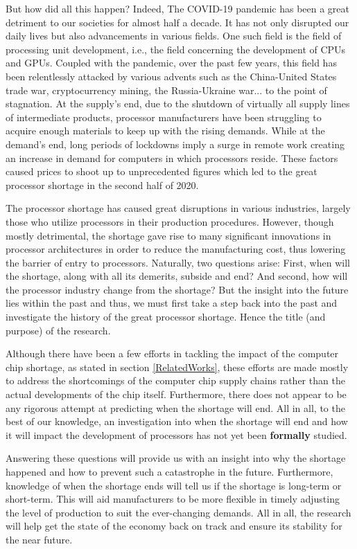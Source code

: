\documentclass[conference]{IEEEtran}
\begin{document}
But how did all this happen? Indeed, The COVID-19 pandemic has been a
great detriment to our societies for almost half a decade. It has not
only disrupted our daily lives but also advancements in various
fields. One such field is the field of processing unit development, i.e.,
the field concerning the development of CPUs and GPUs. Coupled with the
pandemic, over the past few years, this field has been relentlessly attacked
by various advents such as the China-United States trade war, cryptocurrency
mining, the Russia-Ukraine war...\cite{Wikipedia:2023} to the point of
stagnation. At the supply's
end, due to the shutdown of virtually all supply lines of intermediate
products, processor manufacturers have been struggling to acquire enough
materials to keep up with the rising demands. While at the demand's end,
long periods of lockdowns imply a surge in remote work creating an
increase in demand for computers in which processors reside. These
factors caused prices to shoot up to unprecedented figures which led to
the great processor shortage in the second half of 2020.

The processor shortage has caused great disruptions in various
industries, largely those who utilize processors in their production
procedures. However, though mostly detrimental, the shortage gave rise to
many significant innovations in processor architectures in order to
reduce the manufacturing cost, thus lowering the barrier of entry to
processors. Naturally, two questions arise: First, when will the
shortage, along with all its demerits, subside and end? And second, how
will the processor industry change from the shortage? But the insight
into the future lies within the past and thus, we must first take a step
back into the past and investigate the history of the great
processor shortage. Hence the title (and purpose) of the research.

Although there have been a few efforts in tackling the impact of the
computer chip shortage, as stated in section \ref{RelatedWorks}, these
efforts are made mostly to address the shortcomings of the computer chip
supply chains rather than the actual developments of the chip itself.
Furthermore, there does not appear to be any rigorous attempt at predicting
when the shortage will end. All in all, to the
best of our knowledge, an investigation into when the shortage will end and how
it will impact the development of processors has not yet been \textbf{formally}
studied.

Answering these questions will provide us with an insight into why the
shortage happened and how to prevent such a catastrophe in the future.
Furthermore, knowledge of when the shortage ends will tell us if the
shortage is long-term or short-term. This will aid manufacturers to be
more flexible in timely adjusting the level of production to suit the
ever-changing demands. All in all, the research will help get the state
of the economy back on track and ensure its stability for the near future.
\end{document}
